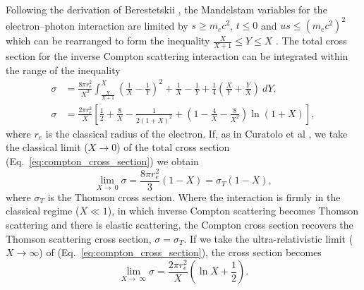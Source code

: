 \documentclass[../main.tex]{subfiles}
\begin{document}
Following the derivation of Berestetskii \cite{berestetskii1982quantum}, the Mandelstam variables for the electron--photon interaction are limited by $s\geq m_{e}c^{2}$, $t \leq 0$ and $u s \leq \left(m_{e}c^{2}\right)^{2}$ which can be rearranged to form the inequality $\frac{X}{X+1} \leq Y \leq X$ \cite{sun2009characterizations}. The total cross section for the inverse Compton scattering interaction \cite{berestetskii1982quantum} can be integrated within the range of the inequality
\begin{align}
\sigma &= \frac{8\pi r_{e}^{2}}{X^{2}}\int_{\frac{X}{X+1}}^{X}\left(\frac{1}{X}-\frac{1}{Y}\right)^{2}+\frac{1}{X}-\frac{1}{Y}+\frac{1}{4}\left(\frac{X}{Y}+\frac{Y}{X}\right)~dY, \nonumber \\
\sigma &= \frac{2\pi r_{e}^{2}}{X}\left[\frac{1}{2}+\frac{8}{X}-\frac{1}{2\left(1+X\right)^{2}}+\left(1-\frac{4}{X}-\frac{8}{X^{2}}\right)\ln{\left(1+X\right)}\right],
\label{eq:compton_cross_section}
\end{align}
where $r_{e}$ is the classical radius of the electron. If, as in Curatolo et al \cite{curatolo2017analytical}, we take the classical limit ($X \to 0$) of the total cross section (Eq.~\ref{eq:compton_cross_section}) we obtain
\begin{equation}
\lim_{X \to ~0} \sigma = \frac{8\pi r_{e}^{2}}{3}\left(1-X\right) = \sigma_{T}\left(1-X\right),
\label{eq:compton_cross_section_classical_limit}
\end{equation}
where $\sigma_{T}$ is the Thomson cross section. Where the interaction is firmly in the classical regime ($X \ll 1$), in which inverse Compton scattering becomes Thomson scattering and there is elastic scattering, the Compton cross section recovers the Thomson scattering cross section, $\sigma = \sigma_{T}$. If we take the ultra-relativistic limit ($X \to \infty$) of (Eq.~\ref{eq:compton_cross_section}), the cross section becomes
\begin{equation}
\lim_{X \to ~\infty} \sigma = \frac{2\pi r_{e}^{2}}{X}\left(\ln{X}+\frac{1}{2}\right).
\label{eq:compton_cross_section_ultrarelativistic_limit}
\end{equation}
\end{document}
